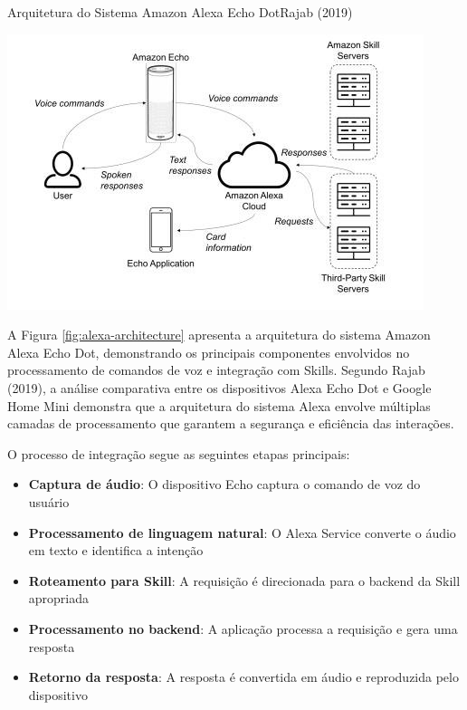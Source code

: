 \begin{figura}{Arquitetura do Sistema Amazon Alexa Echo Dot}{Rajab (2019)}
    \begin{flushleft}
        \label{fig:alexa-architecture}
        \includegraphics[width=0.95\linewidth]{resources/floats/ilustracoes/AMAZON_ALEXA_ECHO_DOT_SYSTEM_ARCHITECTURE.png}
    \end{flushleft}
\end{figura}

A Figura \ref{fig:alexa-architecture} apresenta a arquitetura do sistema Amazon Alexa Echo Dot, demonstrando os principais componentes envolvidos no processamento de comandos de voz e integração com Skills. Segundo Rajab (2019), a análise comparativa entre os dispositivos Alexa Echo Dot e Google Home Mini demonstra que a arquitetura do sistema Alexa envolve múltiplas camadas de processamento que garantem a segurança e eficiência das interações.

O processo de integração segue as seguintes etapas principais:

\begin{itemize}
    \item \textbf{Captura de áudio}: O dispositivo Echo captura o comando de voz do usuário
    \item \textbf{Processamento de linguagem natural}: O Alexa Service converte o áudio em texto e identifica a intenção
    \item \textbf{Roteamento para Skill}: A requisição é direcionada para o backend da Skill apropriada
    \item \textbf{Processamento no backend}: A aplicação processa a requisição e gera uma resposta
    \item \textbf{Retorno da resposta}: A resposta é convertida em áudio e reproduzida pelo dispositivo
\end{itemize}


